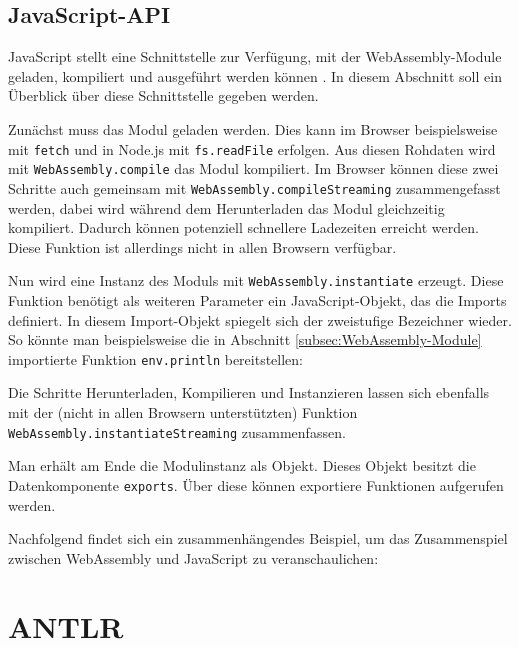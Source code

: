 \subsection{JavaScript-API}
\label{subsec:WebAssembly-JavaScript-API}
JavaScript stellt eine Schnittstelle zur Verfügung, mit der WebAssembly-Module geladen, kompiliert und ausgeführt werden können \cite{MDNWebAssembly}. In diesem Abschnitt soll ein Überblick über diese Schnittstelle gegeben werden.

Zunächst muss das Modul geladen werden. Dies kann im Browser beispielsweise mit \lstinline{fetch} und in Node.js mit \lstinline{fs.readFile} erfolgen. Aus diesen Rohdaten wird mit \lstinline{WebAssembly.compile} das Modul kompiliert. Im Browser können diese zwei Schritte auch gemeinsam mit \lstinline{WebAssembly.compileStreaming} zusammengefasst werden, dabei wird während dem Herunterladen das Modul gleichzeitig kompiliert. Dadurch können potenziell schnellere Ladezeiten erreicht werden. Diese Funktion ist allerdings nicht in allen Browsern verfügbar.

Nun wird eine Instanz des Moduls mit \lstinline{WebAssembly.instantiate} erzeugt. Diese Funktion benötigt als weiteren Parameter ein JavaScript-Objekt, das die Imports definiert. In diesem Import-Objekt spiegelt sich der zweistufige Bezeichner wieder. So könnte man beispielsweise die in Abschnitt \ref{subsec:WebAssembly-Module} importierte Funktion \lstinline{env.println} bereitstellen:



Die Schritte Herunterladen, Kompilieren und Instanzieren lassen sich ebenfalls mit der (nicht in allen Browsern unterstützten) Funktion \lstinline{WebAssembly.instantiateStreaming} zusammenfassen.

Man erhält am Ende die Modulinstanz als Objekt. Dieses Objekt besitzt die Datenkomponente \lstinline{exports}. Über diese können exportiere Funktionen aufgerufen werden.

Nachfolgend findet sich ein zusammenhängendes Beispiel, um das Zusammenspiel zwischen WebAssembly und JavaScript zu veranschaulichen:



\section{ANTLR}
